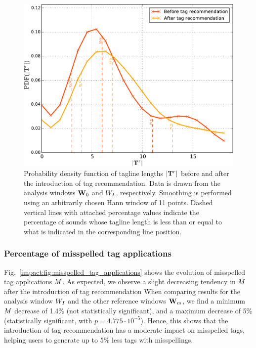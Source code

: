 \begin{figure}
\centerline{\includegraphics[width=0.7\columnwidth]{ch05_impact/pics/fig10_length_of_tagline_histogram}}
\caption[Probability density function of tagline lengths]{Probability density function of tagline lengths $|\mathbf{T}^r|$ before and after the introduction of tag recommendation. Data is drawn from the analysis windows $\mathbf{W}_0$ and $W_I$, respectively. Smoothing is performed using an arbitrarily chosen Hann window of 11 points. Dashed vertical lines with attached percentage values indicate the percentage of sounds whose tagline length is less than or equal to what is indicated in the corresponding line position.}
\label{impact:fig:length_of_tagline_distribution}
\end{figure}


\subsubsection{Percentage of misspelled tag applications}
\label{impact:sec:misspelled_tag_applications}

Fig.~\ref{impact:fig:misspelled_tag_applications} shows the evolution of misspelled tag applications $M$. 
As expected, we observe a slight decreasing tendency in $M$ after the introduction of tag recommendation
When comparing results for the analysis window $W_I$ and the other reference windows $\mathbf{W}_m$, we find a minimum $M$ decrease of 1.4\% (not statistically significant), and a maximum decrease of 5\% (statistically significant, with $p = 4.775\cdot 10^{-5}$). 
Hence, this shows that the introduction of tag recommendation has a moderate impact on misspelled tags, helping users to generate up to 5\% less tags with misspellings.

